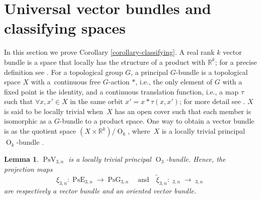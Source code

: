 \documentclass[11pt]{article}
\newcommand{\ie}{i.e.,\xspace}
\numberwithin{equation}{section}
\newtheorem{lemma}[theorem]{Lemma}
\theoremstyle{remark}
\let\mb\mathbb
\DeclareMathOperator{\pg}{PsG}
\DeclareMathOperator{\pog}{Ps\widetilde G}
\DeclareMathOperator{\pe}{PsE}
\DeclareMathOperator{\poe}{Ps\widetilde{E}}
\DeclareMathOperator{\orth}{O}
\DeclareMathOperator{\pstief}{PsV}
\begin{document}
\section{Universal vector bundles and classifying spaces}\label{section-bundles}

In this section we prove Corollary \ref{corollary-classifying}.
A real rank $k$ vector bundle is a space that locally has the structure of a product with $\mb{R}^k$;
for a precise definition see \hbox{\cite[p.\,24]{husemoller1994fibre}}.
For a topological group $G$, a principal $G$-bundle is a topological space $X$ with a~continuous free $G$-action $*$, \ie the only element of $G$ with a fixed point is the identity,
and a continuous translation function, \ie a map $\tau$ such that $\forall x,x' \in X$ in the same orbit $x' = x*\tau(x,x')$; for more detail see \cite[p.\,42]{husemoller1994fibre}.
$X$ is said to be locally trivial when~$X$ has an open cover such that each member is isomorphic as a $G$-bundle to a product space.
One way to obtain a vector bundle is as the quotient space $(X \times \mb{R}^k)/\orth_k$, where~$X$ is a locally trivial principal $\orth_k$-bundle \cite[Chap.\,5]{husemoller1994fibre}.

\begin{lemma}\label{lemma-principal-bundle}
$\pstief_{3,n}$ is a locally trivial principal $\orth_3$-bundle.
Hence, the projection maps
$$ \xi_{3,n}: \pe_{3,n} \to \pg_{3,n} \quad \text{and} \quad \widetilde\xi_{3,n}: \poe_{3,n} \to \pog_{3,n} $$
are respectively a vector bundle and an oriented vector bundle. \end{lemma}
\end{document}
